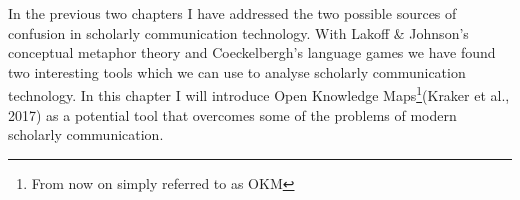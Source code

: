 In the previous two chapters I have addressed the two possible sources of confusion in scholarly communication technology. With Lakoff & Johnson’s conceptual metaphor theory and Coeckelbergh’s language games we have found two interesting tools which we can use to analyse scholarly communication technology. In this chapter I will introduce Open Knowledge Maps\footnote{From now on simply referred to as OKM }(Kraker et al., 2017) as a potential tool that overcomes some of the problems of modern scholarly communication.
